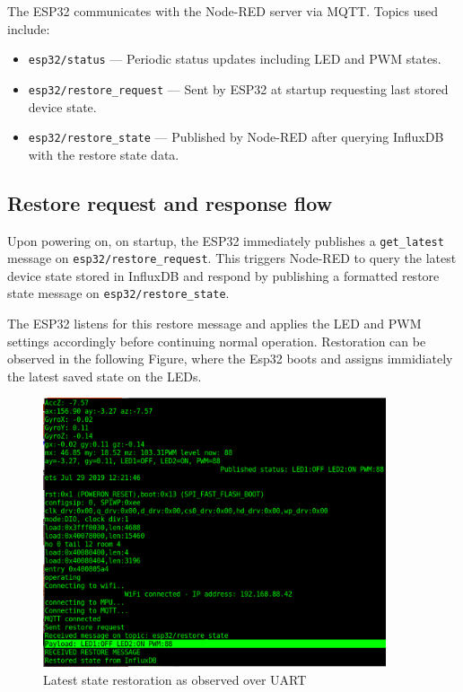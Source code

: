 \documentclass[a4paper,12pt]{article}
\begin{document}
The ESP32 communicates with the Node-RED 
server via MQTT. Topics used include:

\begin{itemize}
    \item \texttt{esp32/status} — Periodic status updates including LED and PWM states.
    \item \texttt{esp32/restore\_request} — Sent by ESP32 at startup requesting last stored device state.
    \item \texttt{esp32/restore\_state} — Published by Node-RED after querying InfluxDB with the restore state data.
\end{itemize}

\subsection{Restore request and response flow}

Upon powering on, on startup, 
the ESP32 immediately publishes a \texttt{get\_latest} message 
on \texttt{esp32/restore\_request}. 
This triggers Node-RED to query the latest device state 
stored in InfluxDB and respond by publishing a 
formatted restore state message on \texttt{esp32/restore\_state}.

The ESP32 listens for this restore message and 
applies the LED and PWM settings accordingly before 
continuing normal operation.
Restoration can be observed in the following Figure, where the Esp32 
boots and assigns immidiately the latest saved state on the LEDs.

		\begin{figure}[H]
			\centering
			\includegraphics[width=0.9\textwidth]{restore.png}
			\caption{Latest state restoration as observed over UART}
			\label{fig1:}
		\end{figure}		
\end{document}
